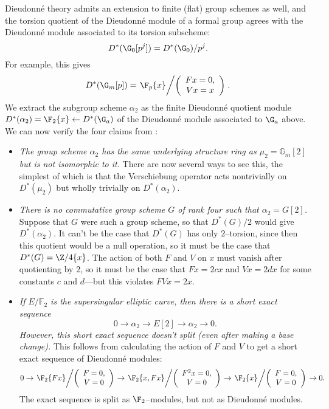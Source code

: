 \begin{example}\label{WorkedAlpha2Example}
Dieudonn\'e theory admits an extension to finite (flat) group schemes as well, and the torsion quotient of the Dieudonn\'e module of a formal group agrees with the Dieudonn\'e module associated to its torsion subscheme: \[D^*(\G_0[p^j]) = D^*(\G_0) / p^j.\]  For example, this gives \[D^*(\G_m[p]) = \left.\F_p\{x\} \middle/\left(\begin{array}{c} Fx = 0, \\ Vx = x \end{array}\right)\right. .\]  We extract the subgroup scheme $\alpha_2$ as the finite Dieudonn\'e quotient module $D^*(\alpha_2) = \F_2\{x\} \leftarrow D^*(\G_a)$ of the Dieudonn\'e module associated to $\G_a$ above.  We can now verify the four claims from :
\begin{itemize}
\item \textit{The group scheme $\alpha_2$ has the same underlying structure ring as $\mu_2 = \mathbb{G}_m[2]$ but is not isomorphic to it.}  There are now several ways to see this, the simplest of which is that the Verschiebung operator acts nontrivially on $D^*(\mu_2)$ but wholly trivially on $D^*(\alpha_2)$.
\item \textit{There is no commutative group scheme $G$ of rank four such that $\alpha_2 = G[2]$.}  Suppose that $G$ were such a group scheme, so that $D^*(G) / 2$ would give $D^*(\alpha_2)$.  It can't be the case that $D^*(G)$ has only $2$--torsion, since then this quotient would be a null operation, so it must be the case that $D^*(G) = \Z/4\{x\}$.  The action of both $F$ and $V$ on $x$ must vanish after quotienting by $2$, so it must be the case that $Fx = 2cx$ and $Vx = 2dx$ for some constants $c$ and $d$---but this violates $FVx = 2x$.
\item \textit{If $E/\mathbb{F}_2$ is the supersingular elliptic curve, then there is a short exact sequence \[0 \rightarrow \alpha_2 \rightarrow E[2] \rightarrow \alpha_2 \rightarrow 0.\]  However, this short exact sequence doesn't split (even after making a base change).}  This follows from calculating the action of $F$ and $V$ to get a short exact sequence of Dieudonn\'e modules: \[0 \to \left.\F_2\{Fx\}\middle / \left(\begin{array}{c} F = 0, \\ V = 0 \end{array}\right)\right. \to \left.\F_2\{x, Fx\} \middle/ \left( \begin{array}{c} F^2x = 0, \\ V = 0 \end{array}\right) \right. \to \left.\F_2\{x\}\middle / \left(\begin{array}{c} F = 0, \\ V = 0 \end{array}\right)\right. \to 0.\]  The exact sequence is split as $\F_2$--modules, but not as Dieudonn\'e modules.

\end{itemize}
\end{example}
